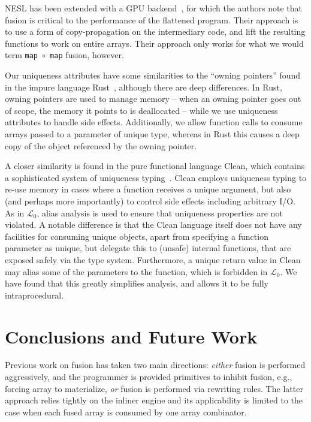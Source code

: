\documentclass{sigplanconf}  %
\newcommand{\LO}{$\mathcal{L}_0$}
\begin{document}
NESL has been extended with a GPU backend~\cite{bergstrom2012nested},
for which the authors note that fusion is critical to the performance
of the flattened program.  Their approach is to use a form of
copy-propagation on the intermediary code, and lift the resulting
functions to work on entire arrays.  Their approach only works for
what we would term {\tt map $\circ$ map} fusion, however.

Our uniqueness attributes have some similarities to the ``owning
pointers'' found in the impure language Rust~\cite{rust}, although
there are deep differences.  In Rust, owning pointers are used to
manage memory -- when an owning pointer goes out of scope, the memory
it points to is deallocated -- while we use uniqueness attributes to
handle side effects.  Additionally, we allow function calls to consume
arrays passed to a parameter of unique type, whereas in Rust this
causes a deep copy of the object referenced by the owning pointer.

A closer similarity is found in the pure functional language Clean,
which contains a sophisticated system of uniqueness
typing~\cite{barendsen1996uniqueness}.  Clean employs uniqueness
typing to re-use memory in cases where a function receives a unique
argument, but also (and perhaps more importantly) to control side
effects including arbitrary I/O.  As in \LO{}, alias analysis is used
to ensure that uniqueness properties are not violated.  A notable
difference is that the Clean language itself does not have any
facilities for consuming unique objects, apart from specifying a
function parameter as unique, but delegate this to (unsafe) internal
functions, that are exposed safely via the type system.  Furthermore,
a unique return value in Clean may alias some of the parameters to the
function, which is forbidden in \LO{}.  We have found that this
greatly simplifies analysis, and allows it to be fully
intraprocedural.

\section{Conclusions and Future Work}
\label{sec:Concl}

Previous work on fusion has taken two main directions:
{\em either} fusion is performed aggressively, 
and the programmer is provided primitives to inhibit fusion, 
e.g., forcing array to materialize, {\em or} fusion is 
performed via rewriting rules.  The latter approach 
relies tightly on the inliner engine and its applicability 
is limited to the case when each fused array is consumed 
by one array combinator. 
\end{document}
